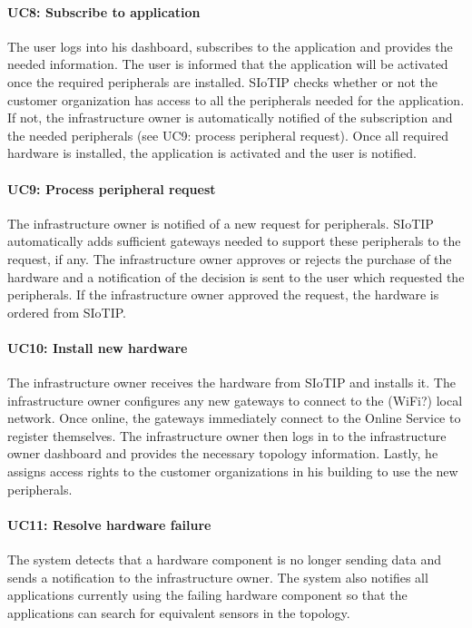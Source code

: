 \documentclass[english]{sareport}
\begin{document}
\paragraph{UC8: Subscribe to application}
The user logs into his dashboard, subscribes to the application and provides the needed information. The user is informed that the application will be activated once the required peripherals are installed. SIoTIP checks whether or not the customer organization has access to all the peripherals needed for the application. If not, the infrastructure owner is automatically notified of the subscription and the needed peripherals (see UC9: process peripheral request). Once all required hardware is installed, the application is activated and the user is notified.

\paragraph{UC9: Process peripheral request}
The infrastructure owner is notified of a new request for peripherals. SIoTIP automatically adds sufficient gateways needed to support these peripherals to the request, if any. The infrastructure owner approves or rejects the purchase of the hardware and a notification of the decision is sent to the user which requested the peripherals. If the infrastructure owner approved the request, the hardware is ordered from SIoTIP.

\paragraph{UC10: Install new hardware}
The infrastructure owner receives the hardware from SIoTIP and installs it. The infrastructure owner configures any new gateways to connect to the (WiFi?) local network. Once online, the gateways immediately connect to the Online Service to register themselves. The infrastructure owner then logs in to the infrastructure owner dashboard and provides the necessary topology information. Lastly, he assigns access rights to the customer organizations in his building to use the new peripherals.

\paragraph{UC11: Resolve hardware failure}
The system detects that a hardware component is no longer sending data and sends a notification to the infrastructure owner. The system also notifies all applications currently using the failing hardware component so that the applications can search for equivalent sensors in the topology. 
\end{document}
